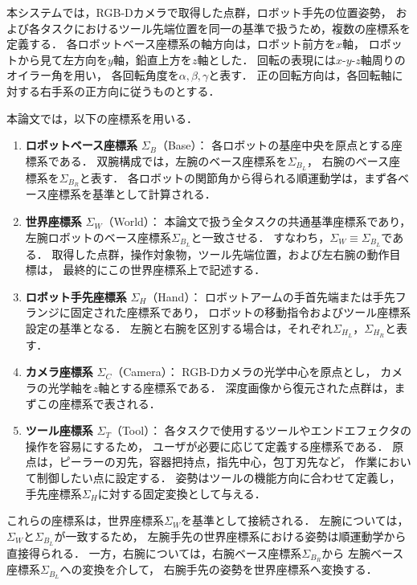 本システムでは，RGB-Dカメラで取得した点群，ロボット手先の位置姿勢，
および各タスクにおけるツール先端位置を同一の基準で扱うため，複数の座標系を定義する．
各ロボットベース座標系の軸方向は，ロボット前方を$x$軸，
ロボットから見て左方向を$y$軸，鉛直上方を$z$軸とした．
回転の表現には$x$-$y$-$z$軸周りのオイラー角を用い，
各回転角度を$\alpha,\beta,\gamma$と表す．
正の回転方向は，各回転軸に対する右手系の正方向に従うものとする．

本論文では，以下の座標系を用いる．

\begin{enumerate}
  \item \textbf{ロボットベース座標系} $\Sigma_{B}$（Base）：
  各ロボットの基座中央を原点とする座標系である．
  双腕構成では，左腕のベース座標系を$\Sigma_{B_L}$，
  右腕のベース座標系を$\Sigma_{B_R}$と表す．
  各ロボットの関節角から得られる順運動学は，まず各ベース座標系を基準として計算される．

  \item \textbf{世界座標系} $\Sigma_{W}$（World）：
  本論文で扱う全タスクの共通基準座標系であり，
  左腕ロボットのベース座標系$\Sigma_{B_L}$と一致させる．
  すなわち，$\Sigma_W \equiv \Sigma_{B_L}$である．
  取得した点群，操作対象物，ツール先端位置，および左右腕の動作目標は，
  最終的にこの世界座標系上で記述する．

  \item \textbf{ロボット手先座標系} $\Sigma_{H}$（Hand）：
  ロボットアームの手首先端または手先フランジに固定された座標系であり，
  ロボットの移動指令およびツール座標系設定の基準となる．
  左腕と右腕を区別する場合は，それぞれ$\Sigma_{H_L}$，$\Sigma_{H_R}$と表す．

  \item \textbf{カメラ座標系} $\Sigma_{C}$（Camera）：
  RGB-Dカメラの光学中心を原点とし，
  カメラの光学軸を$z$軸とする座標系である．
  深度画像から復元された点群は，まずこの座標系で表される．

  \item \textbf{ツール座標系} $\Sigma_{T}$（Tool）：
  各タスクで使用するツールやエンドエフェクタの操作を容易にするため，
  ユーザが必要に応じて定義する座標系である．
  原点は，ピーラーの刃先，容器把持点，指先中心，包丁刃先など，
  作業において制御したい点に設定する．
  姿勢はツールの機能方向に合わせて定義し，
  手先座標系$\Sigma_H$に対する固定変換として与える．
\end{enumerate}

これらの座標系は，世界座標系$\Sigma_W$を基準として接続される．
左腕については，$\Sigma_W$と$\Sigma_{B_L}$が一致するため，
左腕手先の世界座標系における姿勢は順運動学から直接得られる．
一方，右腕については，右腕ベース座標系$\Sigma_{B_R}$から
左腕ベース座標系$\Sigma_{B_L}$への変換を介して，
右腕手先の姿勢を世界座標系へ変換する．

